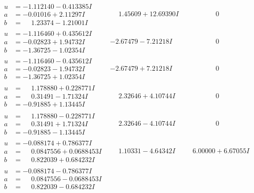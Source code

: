 \documentclass[1p]{elsarticle_modified}
\theoremstyle{definition}
\begin{document}
$$\begin{array}{c|c|c}
\begin{aligned}
u &= -1.112140 - 0.413385 I \\
a &= -0.01016 + 2.11297 I \\
b &= \phantom{-}1.23374 - 1.21001 I\end{aligned}
 & \phantom{-}1.45609 + 12.69390 I & \phantom{-0.000000 } 0 \\ \hline\begin{aligned}
u &= -1.116460 + 0.435612 I \\
a &= -0.02823 + 1.94732 I \\
b &= -1.36725 - 1.02354 I\end{aligned}
 & -2.67479 - 7.21218 I & \phantom{-0.000000 } 0 \\ \hline\begin{aligned}
u &= -1.116460 - 0.435612 I \\
a &= -0.02823 - 1.94732 I \\
b &= -1.36725 + 1.02354 I\end{aligned}
 & -2.67479 + 7.21218 I & \phantom{-0.000000 } 0 \\ \hline\begin{aligned}
u &= \phantom{-}1.178880 + 0.228771 I \\
a &= \phantom{-}0.31491 - 1.71324 I \\
b &= -0.91885 + 1.13445 I\end{aligned}
 & \phantom{-}2.32646 + 4.10744 I & \phantom{-0.000000 } 0 \\ \hline\begin{aligned}
u &= \phantom{-}1.178880 - 0.228771 I \\
a &= \phantom{-}0.31491 + 1.71324 I \\
b &= -0.91885 - 1.13445 I\end{aligned}
 & \phantom{-}2.32646 - 4.10744 I & \phantom{-0.000000 } 0 \\ \hline\begin{aligned}
u &= -0.088174 + 0.786377 I \\
a &= \phantom{-}0.0847556 + 0.0688453 I \\
b &= \phantom{-}0.822039 + 0.684232 I\end{aligned}
 & \phantom{-}1.10331 - 4.64342 I & \phantom{-}6.00000 + 6.67055 I \\ \hline\begin{aligned}
u &= -0.088174 - 0.786377 I \\
a &= \phantom{-}0.0847556 - 0.0688453 I \\
b &= \phantom{-}0.822039 - 0.684232 I\end{aligned}

\end{array}$$
\end{document}
